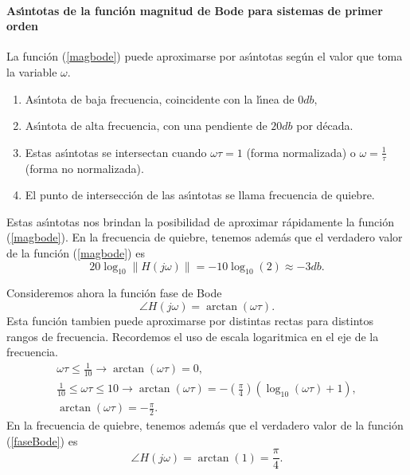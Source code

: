 \paragraph{As\'{\i}ntotas de la funci\'{o}n magnitud de Bode para sistemas de primer orden}
La funci\'{o}n (\ref{magbode}) puede aproximarse por as\'{\i}ntotas seg\'{u}n el valor que toma la 
variable $\omega.$
\begin{enumerate}
   \item  As\'{\i}ntota de baja frecuencia, coincidente con la l\'{\i}nea de $0db, $
   \item  As\'{\i}ntota de alta frecuencia, con una pendiente de $20db$ por d\'{e}cada.
   \item  Estas as\'{\i}ntotas se intersectan cuando $\omega \tau =1$ (forma normalizada) o 
     $\omega =\frac{1}{\tau }$ (forma no normalizada).
   \item  El punto de intersecci\'{o}n de las as\'{\i}ntotas se llama frecuencia de quiebre.
\end{enumerate}

Estas as\'{\i}ntotas nos brindan la posibilidad de aproximar r\'{a}pidamente la 
funci\'{o}n (\ref{magbode}). En la frecuencia de quiebre, tenemos adem\'{a}s que el verdadero valor de la 
funci\'{o}n (\ref{magbode}) es 
\begin{equation}
    20\log _{10}\left\| H\left( j\omega \right) \right\| =-10\log _{10}\left(2\right) \approx -3db.
\end{equation}

Consideremos ahora la funci\'{o}n fase de Bode 
\begin{equation}
\angle H\left( j\omega \right) =\arctan \left( \omega \tau \right) . \label{faseBode}
\end{equation}
Esta funci\'{o}n tambien puede aproximarse por distintas rectas para distintos rangos de frecuencia. 
Recordemos el uso de escala logaritmica en el eje de la frecuencia.
\begin{equation}
\begin{array}{r}
   \omega \tau \leq \frac{1}{10}\rightarrow \arctan \left( \omega \tau \right) =0, \\ 
    \frac{1}{10}\leq \omega \tau \leq 10\rightarrow \arctan \left( \omega \tau \right) =
        -\left( \frac{\pi }{4}\right) \left( \log _{10}\left( \omega \tau \right) +1\right) , \\ 
   \arctan \left( \omega \tau \right) =-\frac{\pi }{2}.
\end{array}
\end{equation}
En la frecuencia de quiebre, tenemos adem\'{a}s que el verdadero valor de la funci\'{o}n 
(\ref{faseBode}) es 
\begin{equation}
\angle H\left( j\omega \right) =\arctan \left( 1\right) =\frac{\pi }{4}.
\end{equation}


